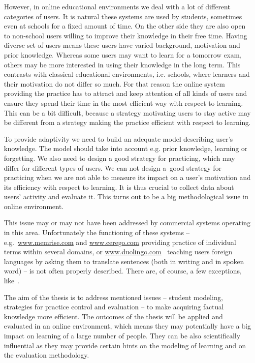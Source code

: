 \documentclass[table,color,cover,twoside,nolot,nolof]{fithesis3/fithesis3}
\begin{document}
However, in online educational environments we deal with a lot of different
categories of users. It is natural these systems are used by students,
sometimes even at schools for a fixed amount of time. On the other side they
are also open to non-school users willing to improve their knowledge in their
free time. Having diverse set of users means these users have varied
background, motivation and prior knowledge. Whereas some users may want to
learn for a tomorrow exam, others may be more interested in using their
knowledge in the long term. This contrasts with classical educational
environments, i.e. schools, where learners and their motivation do not differ
so much. For that reason the online system providing the practice has to
attract and keep attention of all kinds of users and ensure they spend
their time in the most efficient way with respect to learning. This can be a
bit difficult, because a strategy motivating users to stay active may be
different from a strategy making the practice efficient with respect to
learning.

To provide adaptivity we need to build an adequate model describing user's
knowledge. The model should take into account e.g. prior knowledge, learning or
forgetting. We also need to design a good strategy for practicing, which may
differ for different types of users. We can not design a~good strategy for
practicing when we are not able to measure its impact on a user's motivation and
its efficiency with respect to learning. It is thus crucial to collect data
about users' activity and evaluate it. This turns out to be a big
methodological issue in online environment.

This issue may or may not have been addressed by commercial systems operating
in this area. Unfortunately the functioning of these systems --
e.g.~\url{www.memrise.com} and \url{www.cerego.com} providing practice of
individual terms within several domains, or
\url{www.duolingo.com}~\cite{garcia2013learning} teaching users foreign
languages by asking them to translate sentences (both in writing and in spoken
word) -- is not often properly described. There are, of course, a few
exceptions, like~\cite{streeter2015mixture}.

The aim of the thesis is to address mentioned issues -- student modeling,
strategies for practice control and evaluation -- to make acquiring factual
knowledge more efficient. The outcomes of the thesis will be applied and
evaluated in an online environment, which means they may potentially have a big
impact on learning of a large number of people. They can be also scientifically
influential as they may provide certain hints on the modeling of learning and
on the evaluation methodology.
\end{document}
